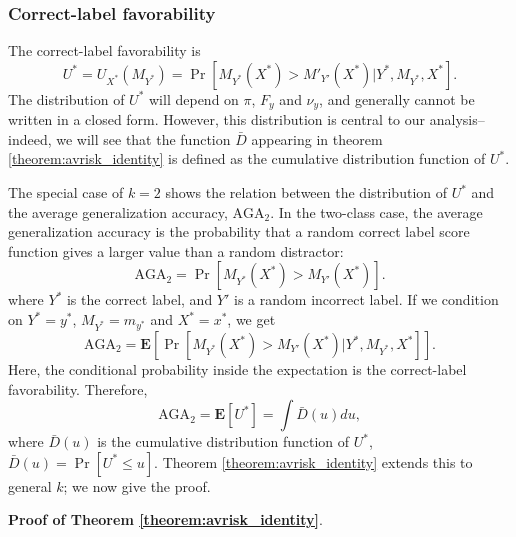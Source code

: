 \documentclass[twoside,11pt]{article}
\newcommand{\E}{\textbf{E}}
\begin{document}
\subsubsection{Correct-label favorability}

The correct-label favorability is 
\begin{equation}
U^* = U_{X^*}(M_{Y^*}) = \Pr[M_{Y^*}(X^*) > M'_{Y'}(X^*)|Y^*,M_{Y^*},X^*].
\end{equation}
The distribution of $U^*$ will depend on $\pi$, $F_y$ and $\nu_y$,
and generally cannot be written in a closed form.  
However, this distribution is central to our analysis--indeed, we will see that the function $\bar{D}$ appearing in theorem \ref{theorem:avrisk_identity} is defined as the cumulative distribution function of $U^*$.

The special case of $k=2$ shows the relation between the distribution of $U^*$ and the average generalization accuracy, $\text{AGA}_2$. In the two-class case, the average generalization accuracy is the probability that a random correct label score function gives a larger value than a random distractor:
\[
\text{AGA}_2 = \Pr[M_{Y^*}(X^*) > M_{Y'}(X^*)].
\]
where $Y^*$ is the correct label, and $Y'$ is a random incorrect label.
If we condition on $Y^* = y^*$, $M_{Y^*} = m_{y^*}$ and $X^* = x^*$, we get
\[
\text{AGA}_2 = \E[\Pr[M_{Y^*}(X^*) > M_{Y'}(X^*)|Y^*, M_{Y^*}, X^*]].
\]
Here, the conditional probability inside the expectation is the correct-label favorability.  Therefore,
\[
\text{AGA}_2 = \E[U^*] = \int \bar{D}(u) du,
\]
where $\bar{D}(u)$ is the cumulative distribution function of $U^*$, $\bar{D}(u) = \Pr[U^* \leq u]$.
Theorem \ref{theorem:avrisk_identity} extends this to general $k$; we now give the proof.\newline


\noindent\textbf{Proof of Theorem \ref{theorem:avrisk_identity}}.
\end{document}
